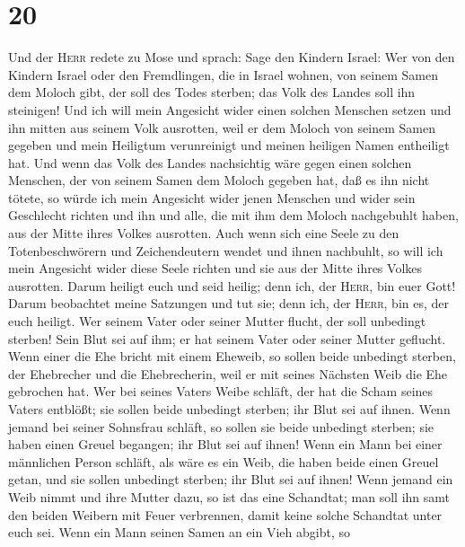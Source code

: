 \hypertarget{section-19}{%
\section{20}\label{section-19}}

 Und der \textsc{Herr} redete zu Mose und sprach: Sage den
Kindern Israel:  Wer von den Kindern Israel oder den
Fremdlingen, die in Israel wohnen, von seinem Samen dem Moloch gibt, der
soll des Todes sterben; das Volk des Landes soll ihn steinigen!
 Und ich will mein Angesicht wider einen solchen Menschen
setzen und ihn mitten aus seinem Volk ausrotten, weil er dem Moloch von
seinem Samen gegeben und mein Heiligtum verunreinigt und meinen heiligen
Namen entheiligt hat.  Und wenn das Volk des Landes
nachsichtig wäre gegen einen solchen Menschen, der von seinem Samen dem
Moloch gegeben hat, daß es ihn nicht tötete,  so würde ich
mein Angesicht wider jenen Menschen und wider sein Geschlecht richten
und ihn und alle, die mit ihm dem Moloch nachgebuhlt haben, aus der
Mitte ihres Volkes ausrotten.  Auch wenn sich eine Seele
zu den Totenbeschwörern und Zeichendeutern wendet und ihnen nachbuhlt,
so will ich mein Angesicht wider diese Seele richten und sie aus der
Mitte ihres Volkes ausrotten.  Darum heiligt euch und seid
heilig; denn ich, der \textsc{Herr}, bin euer Gott!  Darum
beobachtet meine Satzungen und tut sie; denn ich, der \textsc{Herr}, bin
es, der euch heiligt.  Wer seinem Vater oder seiner Mutter
flucht, der soll unbedingt sterben! Sein Blut sei auf ihm; er hat seinem
Vater oder seiner Mutter geflucht.  Wenn einer die Ehe
bricht mit einem Eheweib, so sollen beide unbedingt sterben, der
Ehebrecher und die Ehebrecherin, weil er mit seines Nächsten Weib die
Ehe gebrochen hat.  Wer bei seines Vaters Weibe schläft,
der hat die Scham seines Vaters entblößt; sie sollen beide unbedingt
sterben; ihr Blut sei auf ihnen.  Wenn jemand bei seiner
Sohnsfrau schläft, so sollen sie beide unbedingt sterben; sie haben
einen Greuel begangen; ihr Blut sei auf ihnen!  Wenn ein
Mann bei einer männlichen Person schläft, als wäre es ein Weib, die
haben beide einen Greuel getan, und sie sollen unbedingt sterben; ihr
Blut sei auf ihnen!  Wenn jemand ein Weib nimmt und ihre
Mutter dazu, so ist das eine Schandtat; man soll ihn samt den beiden
Weibern mit Feuer verbrennen, damit keine solche Schandtat unter euch
sei.  Wenn ein Mann seinen Samen an ein Vieh abgibt, so
